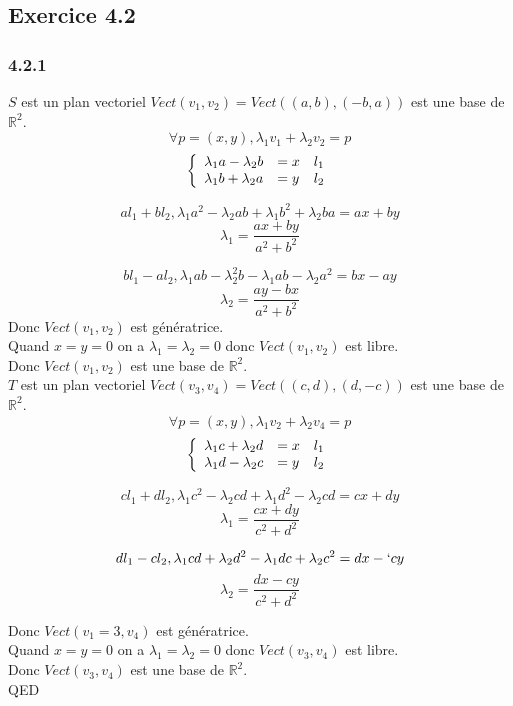 \documentclass[]{book}
\theoremstyle{definition}
\newcommand{\bb}[1]{\mathbb{#1}}
\newcommand{\R}{\bb{R}}
\begin{document}
\subsection*{Exercice 4.2}
\subsubsection*{4.2.1}
$S$ est un plan vectoriel $Vect(v_1,v_2) = Vect((a,b),(-b,a))$ est une base de $\R^2$.\\
$$\forall p=(x,y), \lambda_1 v_1 + \lambda_2 v_2 = p$$
$$
\left\{ 
\begin{array}{l l l}
\lambda_1 a - \lambda_2 b & = x & l_1\\
\lambda_1 b + \lambda_2 a & = y & l_2\\
\end{array}
\right. 
$$

$$a l_1 + b l_2, \lambda_1 a^2-\lambda_2 ab + \lambda_1 b^2 + \lambda_2 ba = ax+by$$
$$\lambda_1 = \frac{ax+by}{a^2+b^2}$$ 

$$b l_1 - a l_2, \lambda_1 ab -\lambda_2 ^2b - \lambda_1 ab - \lambda_2 a^2 = bx-ay$$
$$\lambda_2 = \frac{ay-bx}{a^2+b^2}$$ 
Donc $Vect(v_1,v_2)$ est g\'en\'eratrice.\\

Quand $x=y=0$ on a $\lambda_1 = \lambda_2 = 0$ donc $Vect(v_1,v_2)$ est libre.\\

Donc $Vect(v_1,v_2)$ est une base de $\R^2$.\\

$T$ est un plan vectoriel $Vect(v_3,v_4) = Vect((c,d),(d,-c))$ est une base de $\R^2$.\\
$$\forall p=(x,y), \lambda_1 v_2 + \lambda_2 v_4 = p$$
$$
\left\{ 
\begin{array}{l l l}
\lambda_1 c + \lambda_2 d & = x & l_1\\
\lambda_1 d - \lambda_2 c & = y & l_2\\
\end{array}
\right. 
$$

$$c l_1 + d l_2, \lambda_1 c^2 -\lambda_2 cd + \lambda_1 d^2 - \lambda_2 cd = cx+dy$$
$$\lambda_1 = \frac{cx+dy}{c^2+d^2}$$ 

$$d l_1 - c l_2, \lambda_1 cd + \lambda_2 d^2 - \lambda_1 dc + \lambda_2 c^2 = dx-`cy$$
$$\lambda_2 = \frac{dx-cy}{c^2+d^2}$$ 

Donc $Vect(v_1=3,v_4)$ est g\'en\'eratrice.\\

Quand $x=y=0$ on a $\lambda_1 = \lambda_2 = 0$ donc $Vect(v_3,v_4)$ est libre.\\

Donc $Vect(v_3,v_4)$ est une base de $\R^2$.\\




QED
\end{document}
